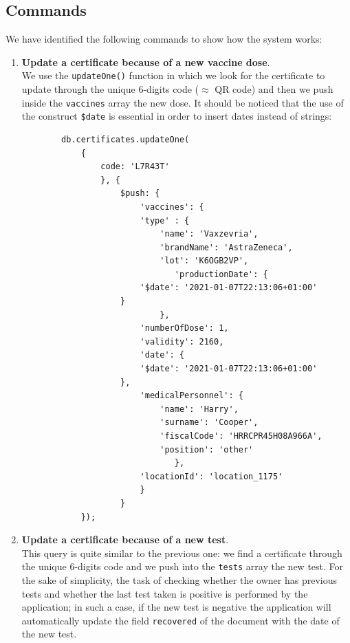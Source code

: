 \documentclass{article}
\begin{document}
\subsection{Commands}
We have identified the following commands to show how the system works:\\
\begin{enumerate}
    \item \textbf{Update a certificate because of a new vaccine dose}.\\
    We use the \verb|updateOne()| function in which we look for the certificate to update through the unique 6-digits code ($\approx$ QR code) and then we push inside the \verb|vaccines| array the new dose. It should be noticed that the use of the construct \verb|$date| is essential in order to insert dates instead of strings:
    \begin{lstlisting}
        db.certificates.updateOne(
            {
                code: 'L7R43T'
                }, {
                    $push: {
                        'vaccines': {
                        'type' : {
                            'name': 'Vaxzevria',
                            'brandName': 'AstraZeneca',
                            'lot': 'K6OGB2VP',
                               'productionDate': {
                        '$date': '2021-01-07T22:13:06+01:00'
                    }
                            },
                        'numberOfDose': 1,
                        'validity': 2160,
                        'date': {
                        '$date': '2021-01-07T22:13:06+01:00'
                    },
                        'medicalPersonnel': {
                            'name': 'Harry',
                            'surname': 'Cooper',
                            'fiscalCode': 'HRRCPR45H08A966A',
                            'position': 'other'
                               },
                        'locationId': 'location_1175'
                        }
                    }
            });
    \end{lstlisting}
    \item \textbf{Update a certificate because of a new test}.\\
    This query is quite similar to the previous one: we find a certificate through the unique 6-digits code and we push into the \verb|tests| array the new test. For the sake of simplicity, the task of checking whether the owner has previous tests and whether the last test taken is positive is performed by the application; in such a case, if the new test is negative the application will automatically update the field \verb|recovered| of the document with the date of the new test.\\

\end{enumerate}
\end{document}

